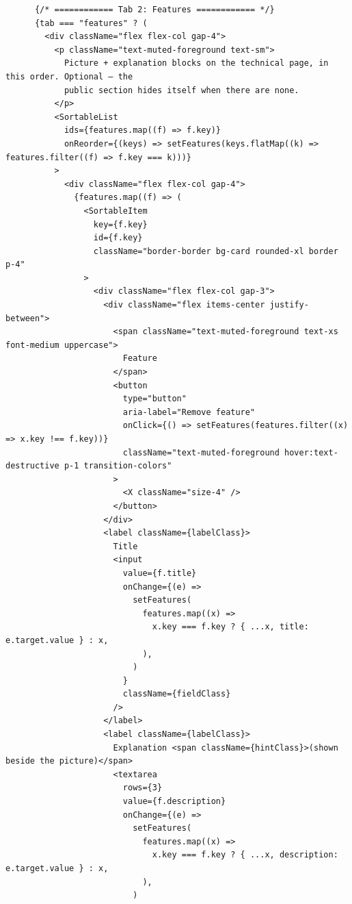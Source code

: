 \documentclass[11pt,a4paper]{article}
\begin{document}
\begin{lstlisting}
      {/* ============ Tab 2: Features ============ */}
      {tab === "features" ? (
        <div className="flex flex-col gap-4">
          <p className="text-muted-foreground text-sm">
            Picture + explanation blocks on the technical page, in this order. Optional — the
            public section hides itself when there are none.
          </p>
          <SortableList
            ids={features.map((f) => f.key)}
            onReorder={(keys) => setFeatures(keys.flatMap((k) => features.filter((f) => f.key === k)))}
          >
            <div className="flex flex-col gap-4">
              {features.map((f) => (
                <SortableItem
                  key={f.key}
                  id={f.key}
                  className="border-border bg-card rounded-xl border p-4"
                >
                  <div className="flex flex-col gap-3">
                    <div className="flex items-center justify-between">
                      <span className="text-muted-foreground text-xs font-medium uppercase">
                        Feature
                      </span>
                      <button
                        type="button"
                        aria-label="Remove feature"
                        onClick={() => setFeatures(features.filter((x) => x.key !== f.key))}
                        className="text-muted-foreground hover:text-destructive p-1 transition-colors"
                      >
                        <X className="size-4" />
                      </button>
                    </div>
                    <label className={labelClass}>
                      Title
                      <input
                        value={f.title}
                        onChange={(e) =>
                          setFeatures(
                            features.map((x) =>
                              x.key === f.key ? { ...x, title: e.target.value } : x,
                            ),
                          )
                        }
                        className={fieldClass}
                      />
                    </label>
                    <label className={labelClass}>
                      Explanation <span className={hintClass}>(shown beside the picture)</span>
                      <textarea
                        rows={3}
                        value={f.description}
                        onChange={(e) =>
                          setFeatures(
                            features.map((x) =>
                              x.key === f.key ? { ...x, description: e.target.value } : x,
                            ),
                          )

\end{lstlisting}
\end{document}
